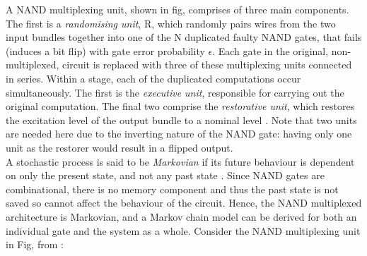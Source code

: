 \noindent A NAND multiplexing unit, shown in fig, comprises of three main components. The first is a \emph{randomising unit}, R, which 
randomly pairs wires from the two input bundles together into one of the N duplicated faulty NAND gates, that fails (induces a bit flip) 
with gate error probability $\epsilon$. Each gate in the original, non-multiplexed, circuit is replaced with three of these multiplexing 
units connected in series. Within a stage, each of the duplicated computations occur simultaneously. The first is the \emph{executive 
unit}, responsible for carrying out the original computation. The final two comprise the \emph{restorative unit}, which restores the 
excitation level of the output bundle to a nominal level \cite{qi2005markov}. Note that two units are needed here due to the inverting 
nature of the NAND gate: having only one unit as the restorer would result in a flipped output. \\ 

\noindent A stochastic process is said to be \emph{Markovian} if its future behaviour is dependent on only the present state, and not any 
past state \cite{jiang2010application}. Since NAND gates are combinational, there is no memory component and thus the past state is not 
saved so cannot affect the behaviour of the circuit. Hence, the NAND multiplexed architecture is Markovian, and a Markov chain model can 
be derived for both an individual gate and the system as a whole. Consider the NAND multiplexing unit in Fig, from \cite{qi2005markov}:


